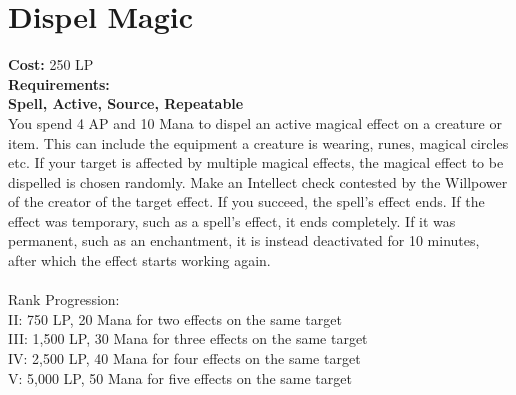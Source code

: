 \section{Dispel Magic}\label{spell:dispelMagic}
\textbf{Cost:} 250 LP\\
\textbf{Requirements:}\\
\textbf{Spell, Active, Source, Repeatable}\\
You spend 4 AP and 10 Mana to dispel an active magical effect on a creature or item.
This can include the equipment a creature is wearing, runes, magical circles etc.
If your target is affected by multiple magical effects, the magical effect to be dispelled is chosen randomly.
Make an Intellect check contested by the Willpower of the creator of the target effect.
If you succeed, the spell's effect ends.
If the effect was temporary, such as a spell's effect, it ends completely.
If it was permanent, such as an enchantment, it is instead deactivated for 10 minutes, after which the effect starts working again.\\
\\
Rank Progression:\\
II: 750 LP, 20 Mana for two effects on the same target\\
III: 1,500 LP, 30 Mana for three effects on the same target\\
IV: 2,500 LP, 40 Mana for four effects on the same target\\
V: 5,000 LP, 50 Mana for five effects on the same target\\